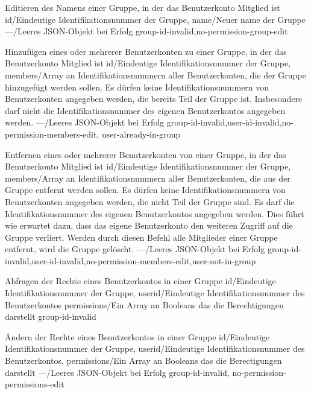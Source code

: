 \documentclass[parskip=full,11pt]{scrartcl}
\begin{document}
{Editieren des Namens einer Gruppe, in der das Benutzerkonto Mitglied ist}
{id/Eindeutige Identifikationsnummer der Gruppe,
name/Neuer name der Gruppe}
{---/Leeres JSON-Objekt bei Erfolg}
{group-id-invalid,no-permission-group-edit}

{Hinzufügen eines oder mehrerer Benutzerkonten zu einer Gruppe, in der das
Benutzerkonto Mitglied ist}
{id/Eindeutige Identifikationsnummer der Gruppe,
members/Array an Identifikationsnummern aller Benutzerkonten{,} die der Gruppe
hinzugefügt werden sollen.
Es dürfen keine Identifikationsnummern von Benutzerkonten angegeben werden{,}
die bereits Teil der Gruppe ist.
Insbesondere darf nicht die Identifikationsnummer des eigenen Benutzerkontos
angegeben werden.}
{---/Leeres JSON-Objekt bei Erfolg}
{group-id-invalid,user-id-invalid,no-permission-members-edit,%
user-already-in-group}

{Entfernen eines oder mehrerer Benutzerkonten von einer Gruppe, in der das
Benutzerkonto Mitglied ist}
{id/Eindeutige Identifikationsnummer der Gruppe,
members/Array an Identifikationsnummern aller Benutzerkonten{,} die aus der
Gruppe entfernt werden sollen.
Es dürfen keine Identifikationsnummern von Benutzerkonten angegeben werden{,}
die nicht Teil der Gruppe sind.
Es darf die Identifikationsnummer des eigenen Benutzerkontos angegeben werden.
Dies führt wie erwartet dazu{,} dass das eigene Benutzerkonto den weiteren
Zugriff auf die Gruppe verliert.
Werden durch diesen Befehl alle Mitglieder einer Gruppe entfernt{,} wird die
Gruppe gelöscht.}
{---/Leeres JSON-Objekt bei Erfolg}
{group-id-invalid,user-id-invalid,no-permission-members-edit,user-not-in-group}

{Abfragen der Rechte eines Benutzerkontos in einer Gruppe}
{id/Eindeutige Identifikationsnummer der Gruppe,
userid/Eindeutige Identifikationsnummer des Benutzerkontos}
{permissions/Ein Array an Booleans das die Berechtigungen darstellt}
{group-id-invalid}

{Ändern der Rechte eines Benutzerkontos in einer Gruppe}
{id/Eindeutige Identifikationsnummer der Gruppe,
userid/Eindeutige Identifikationsnummer des Benutzerkontos,
permissions/Ein Array an Booleans das die Berectigungen darstellt}
{---/Leeres JSON-Objekt bei Erfolg}
{group-id-invalid, no-permission-permissions-edit}
\end{document}
